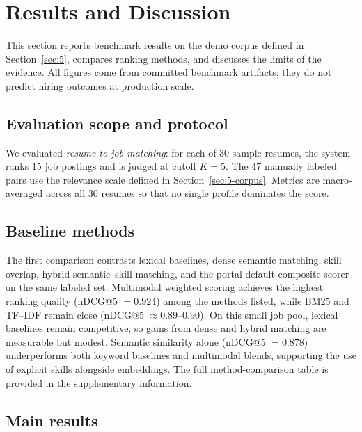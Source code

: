 \section{Results and Discussion}\label{sec:6}

This section reports benchmark results on the demo corpus defined in Section~\ref{sec:5}, compares ranking methods, and discusses the limits of the evidence.
All figures come from committed benchmark artifacts; they do not predict hiring outcomes at production scale.

\subsection{Evaluation scope and protocol}\label{sec:6-evaluated}

We evaluated \emph{resume-to-job matching}: for each of 30 sample resumes, the system ranks 15 job postings and is judged at cutoff $K{=}5$.
The 47 manually labeled pairs use the relevance scale defined in Section~\ref{sec:5-corpus}.
Metrics are macro-averaged across all 30 resumes so that no single profile dominates the score.

\subsection{Baseline methods}\label{sec:6-baselines}\label{sec:6-comparison}

The first comparison contrasts lexical baselines, dense semantic matching, skill overlap, hybrid semantic--skill matching, and the portal-default composite scorer on the same labeled set.
Multimodal weighted scoring achieves the highest ranking quality (nDCG@5 $= 0.924$) among the methods listed, while BM25 and TF--IDF remain close (nDCG@5 $\approx 0.89$--$0.90$).
On this small job pool, lexical baselines remain competitive, so gains from dense and hybrid matching are measurable but modest.
Semantic similarity alone (nDCG@5 $= 0.878$) underperforms both keyword baselines and multimodal blends, supporting the use of explicit skills alongside embeddings.
The full method-comparison table is provided in the supplementary information.

\subsection{Main results}\label{sec:6-main-result}\label{sec:6-progression}\label{sec:6-fusion}


